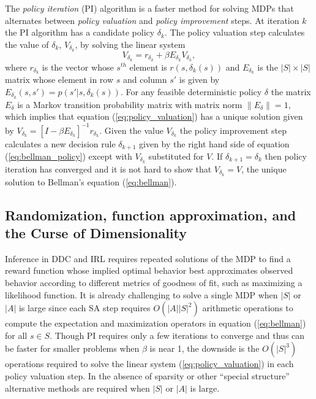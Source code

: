 The \citet{Howard:1960} {\it policy iteration\/} (PI) algorithm is a faster method for solving MDPs that 
alternates between {\it policy valuation\/} and {\it policy improvement\/} steps. At iteration $k$ the PI algorithm has a candidate
policy $\delta_k$. The policy valuation step calculates the value of $\delta_k$,  $V_{\delta_k}$, by solving the linear system
\begin{equation}
     V_{\delta_k} = r_{\delta_k} + \beta E_{\delta_k} V_{\delta_k},
\label{eq:policy_valuation}
\end{equation}
where $r_{\delta_k}$ is the vector whose $s^{th}$ element is $r(s,\delta_k(s))$ and $E_{\delta_k}$ is the $|S| \times |S|$ matrix whose
element in row $s$ and column $s'$ is given by $E_{\delta_k}(s,s')=p(s'|s,\delta_k(s))$. For any feasible deterministic policy $\delta$
the matrix $E_{\delta}$ is a Markov transition probability matrix with matrix norm $\|E_{\delta}\|=1$, which implies that equation (\ref{eq:policy_valuation})
has a unique solution given by $V_{\delta_k}=[I-\beta E_{\delta_k}]^{-1} r_{\delta_k}$. Given the value $V_{\delta_k}$ the  policy improvement step
calculates a new decision rule $\delta_{k+1}$ given by the right hand side of equation (\ref{eq:bellman_policy}) except with 
$V_{\delta_k}$ substituted for $V$. 
If $\delta_{k+1}=\delta_k$ then policy iteration has converged and it is not hard to show that 
$V_{\delta_k}=V$, the unique solution to Bellman's equation (\ref{eq:bellman}).  

\subsection{Randomization, function approximation, and the Curse of Dimensionality}
\label{section:curse}

Inference in DDC and IRL requires repeated solutions of the MDP to find a reward function whose implied optimal behavior
best approximates observed behavior according to different metrics of goodness of fit, such as maximizing a likelihood 
function.  It is already challenging to solve a single MDP when $|S|$ or $|A|$ is large since each SA 
step requires $O(|A||S|^2)$ arithmetic operations to compute the expectation and maximization operators 
in equation (\ref{eq:bellman}) for all $s \in S$. Though PI requires only a few iterations to converge and thus
can be faster for smaller problems when $\beta$ is near 1, the downside is the $O(|S|^3)$ operations
required to solve the linear system (\ref{eq:policy_valuation}) in each policy valuation step.
In the absence of sparsity or other ``special structure'' alternative methods are required when $|S|$ or $|A|$ is large.

